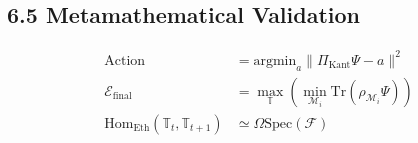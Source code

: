 \documentclass{article}
\begin{document}
\subsection*{6.5 Metamathematical Validation}
\begin{align}
\text{Action} &= \text{argmin}_a \| \Pi_{\text{Kant}} \Psi - a \|^2 \\
\mathcal{E}_{\text{final}} &= \max_{\mathbb{T}} \left( \min_{\mathcal{M}_i} \text{Tr}(\rho_{\mathcal{M}_i} \Psi) \right) \\
\text{Hom}_{\text{Eth}}(\mathbb{T}_t, \mathbb{T}_{t+1}) &\simeq \Omega \text{Spec}(\mathcal{F})
\end{align}
\end{document}
